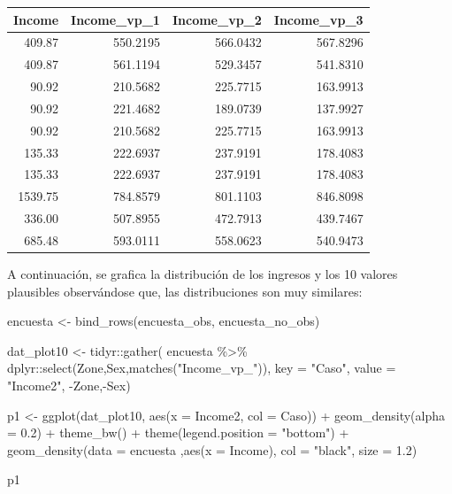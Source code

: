 \documentclass[
  12pt,
]{book}
\newenvironment{Shaded}{\begin{snugshade}}{\end{snugshade}}
\newcommand{\AttributeTok}[1]{\textcolor[rgb]{0.77,0.63,0.00}{#1}}
\newcommand{\FloatTok}[1]{\textcolor[rgb]{0.00,0.00,0.81}{#1}}
\newcommand{\FunctionTok}[1]{\textcolor[rgb]{0.00,0.00,0.00}{#1}}
\newcommand{\NormalTok}[1]{#1}
\newcommand{\OtherTok}[1]{\textcolor[rgb]{0.56,0.35,0.01}{#1}}
\newcommand{\SpecialCharTok}[1]{\textcolor[rgb]{0.00,0.00,0.00}{#1}}
\newcommand{\StringTok}[1]{\textcolor[rgb]{0.31,0.60,0.02}{#1}}
\begin{document}
\begin{tabular}{r|r|r|r}
\hline
Income & Income\_vp\_1 & Income\_vp\_2 & Income\_vp\_3\\
\hline
409.87 & 550.2195 & 566.0432 & 567.8296\\
\hline
409.87 & 561.1194 & 529.3457 & 541.8310\\
\hline
90.92 & 210.5682 & 225.7715 & 163.9913\\
\hline
90.92 & 221.4682 & 189.0739 & 137.9927\\
\hline
90.92 & 210.5682 & 225.7715 & 163.9913\\
\hline
135.33 & 222.6937 & 237.9191 & 178.4083\\
\hline
135.33 & 222.6937 & 237.9191 & 178.4083\\
\hline
1539.75 & 784.8579 & 801.1103 & 846.8098\\
\hline
336.00 & 507.8955 & 472.7913 & 439.7467\\
\hline
685.48 & 593.0111 & 558.0623 & 540.9473\\
\hline
\end{tabular}

A continuación, se grafica la distribución de los ingresos y los 10 valores plausibles observándose que, las distribuciones son muy similares:

\begin{Shaded}
\begin{Highlighting}[]
\NormalTok{encuesta }\OtherTok{\textless{}{-}} \FunctionTok{bind\_rows}\NormalTok{(encuesta\_obs, encuesta\_no\_obs)}

\NormalTok{dat\_plot10 }\OtherTok{\textless{}{-}}\NormalTok{ tidyr}\SpecialCharTok{::}\FunctionTok{gather}\NormalTok{(}
\NormalTok{  encuesta }\SpecialCharTok{\%\textgreater{}\%}\NormalTok{ dplyr}\SpecialCharTok{::}\FunctionTok{select}\NormalTok{(Zone,Sex,}\FunctionTok{matches}\NormalTok{(}\StringTok{"Income\_vp\_"}\NormalTok{)),}
  \AttributeTok{key =} \StringTok{"Caso"}\NormalTok{, }\AttributeTok{value =} \StringTok{"Income2"}\NormalTok{, }\SpecialCharTok{{-}}\NormalTok{Zone,}\SpecialCharTok{{-}}\NormalTok{Sex)}

\NormalTok{p1 }\OtherTok{\textless{}{-}} \FunctionTok{ggplot}\NormalTok{(dat\_plot10, }\FunctionTok{aes}\NormalTok{(}\AttributeTok{x =}\NormalTok{ Income2, }\AttributeTok{col =}\NormalTok{ Caso)) }\SpecialCharTok{+} 
  \FunctionTok{geom\_density}\NormalTok{(}\AttributeTok{alpha =} \FloatTok{0.2}\NormalTok{) }\SpecialCharTok{+} \FunctionTok{theme\_bw}\NormalTok{() }\SpecialCharTok{+}
   \FunctionTok{theme}\NormalTok{(}\AttributeTok{legend.position =} \StringTok{"bottom"}\NormalTok{) }\SpecialCharTok{+} \FunctionTok{geom\_density}\NormalTok{(}\AttributeTok{data =}\NormalTok{ encuesta ,}\FunctionTok{aes}\NormalTok{(}\AttributeTok{x =}\NormalTok{ Income), }\AttributeTok{col =}  \StringTok{"black"}\NormalTok{, }\AttributeTok{size =} \FloatTok{1.2}\NormalTok{) }

\NormalTok{p1}
\end{Highlighting}
\end{Shaded}
\end{document}
